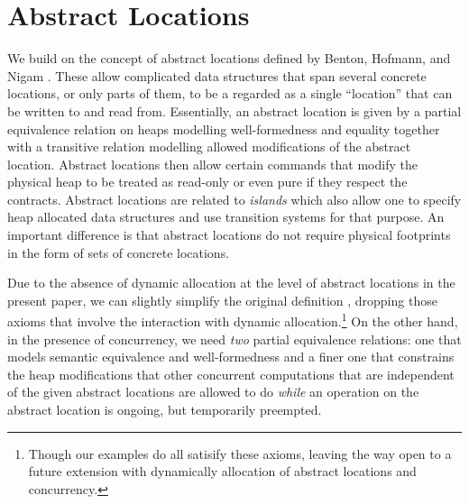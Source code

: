 \documentclass[nocopyrightspace,preprint]{sigplanconf}
\begin{document}
\section{Abstract Locations}
We build on the concept of abstract locations defined by Benton,
Hofmann, and Nigam \cite{DBLP:dblp_conf/popl/Benton0N14}. These allow
complicated data structures that span several concrete locations,
or only parts of them, to be a regarded as a single ``location'' that
can be written to and read from. Essentially, an abstract location is
given by a partial equivalence relation on heaps modelling well-formedness and 
 equality together with a transitive relation modelling allowed
modifications of the abstract location. Abstract locations then allow
certain commands that modify the physical heap to be treated as 
read-only or even pure if they respect the contracts. Abstract locations are
related to \emph{islands} \cite{DBLP:conf/popl/AhmedDR09} which also
  allow one to specify heap allocated data structures and use
  transition systems for that purpose. An important difference is that
  abstract locations do not require physical footprints in the form of
  sets of concrete locations.

Due to the absence of dynamic allocation at the level of abstract
locations in the present paper, we can slightly simplify the original definition 
\cite{DBLP:dblp_conf/popl/Benton0N14}, dropping those axioms that involve the interaction with dynamic allocation.\footnote{Though our examples do all satisify these axioms, leaving the way open to a future extension with dynamically allocation of abstract locations and concurrency.}
On the other hand, in the presence of concurrency, we need \emph{two}
partial equivalence relations: one that  models semantic
equivalence and well-formedness and a finer one that constrains the
heap modifications that other concurrent computations that are
independent of the given abstract locations are allowed to do
\emph{while} an operation on the abstract location is ongoing, but
temporarily preempted.
\end{document}
